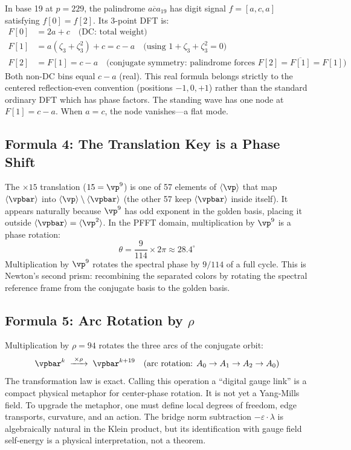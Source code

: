 In base 19 at $p = 229$, the palindrome $\overline{aca}_{19}$ has digit signal $f = [a, c, a]$ satisfying $f[0] = f[2]$. Its 3-point DFT is:
\begin{align}
F[0] &= 2a + c \quad \text{(DC: total weight)} \\
F[1] &= a(\zeta_3 + \zeta_3^2) + c = c - a \quad \text{(using } 1 + \zeta_3 + \zeta_3^2 = 0\text{)} \\
F[2] &= F[1] = c - a \quad \text{(conjugate symmetry: palindrome forces } F[2] = \overline{F[1]} = F[1]\text{)}
\end{align}
Both non-DC bins equal $c - a$ (real). This real formula belongs strictly to the centered reflection-even convention (positions $-1, 0, +1$) rather than the standard ordinary DFT which has phase factors. The standing wave has one node at $F[1] = c - a$. When $a = c$, the node vanishes---a flat mode.

\subsection{Formula 4: The Translation Key is a Phase Shift}

The $\times 15$ translation ($15 = \vp^9$) is one of 57 elements of $\langle \vp \rangle$ that map $\langle \vpbar \rangle$ into $\langle \vp \rangle \setminus \langle \vpbar \rangle$ (the other 57 keep $\langle \vpbar \rangle$ inside itself). It appears naturally because $\vp^9$ has odd exponent in the golden basis, placing it outside $\langle \vpbar \rangle = \langle \vp^2 \rangle$. In the PFFT domain, multiplication by $\vp^9$ is a phase rotation:
\begin{equation}\label{eq:phase_shift}
\theta = \frac{9}{114} \times 2\pi \approx 28.4^\circ
\end{equation}
Multiplication by $\vp^9$ rotates the spectral phase by $9/114$ of a full cycle. This is Newton's second prism: recombining the separated colors by rotating the spectral reference frame from the conjugate basis to the golden basis.

\subsection{Formula 5: Arc Rotation by $\rho$}

Multiplication by $\rho = 94$ rotates the three arcs of the conjugate orbit:
\[
\vpbar^k \;\xrightarrow{\;\times\rho\;}\; \vpbar^{k+19} \quad \text{(arc rotation: } A_0 \to A_1 \to A_2 \to A_0\text{)}
\]
The transformation law is exact. Calling this operation a ``digital gauge link'' is a compact physical metaphor for center-phase rotation. It is not yet a Yang-Mills field. To upgrade the metaphor, one must define local degrees of freedom, edge transports, curvature, and an action. The bridge norm subtraction $-\varepsilon \cdot \lambda$ is algebraically natural in the Klein product, but its identification with gauge field self-energy is a physical interpretation, not a theorem.

